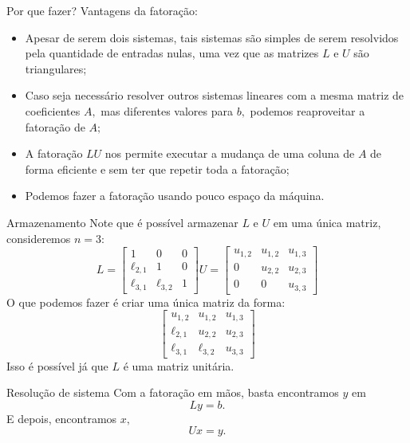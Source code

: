 \documentclass[]{beamer}
\begin{document}
\begin{frame}{Por que fazer?}
Vantagens da fatoração:
\begin{itemize}
\item Apesar de serem dois sistemas, tais sistemas são simples de serem resolvidos pela quantidade de entradas nulas, uma vez que as matrizes $L$ e $U$ são triangulares;

\item  Caso seja necessário resolver outros sistemas lineares com a mesma matriz de coeficientes $A,$ mas diferentes valores para $b,$ podemos reaproveitar a fatoração de $A;$

\item A fatoração $LU$ nos permite executar a mudança de uma coluna de $A$ de forma eficiente e sem ter que repetir toda a fatoração;

\item Podemos fazer a fatoração usando pouco espaço da máquina.
\end{itemize}

\end{frame}

\begin{frame}{Armazenamento}
Note que é possível armazenar $L$ e $U$ em uma única matriz, consideremos $n =3:$
$$L=\begin{bmatrix}1&0&0\\ \ell_{2,1}&1&0\\ \ell_{3,1}&\ell_{3,2}&1\end{bmatrix} U = \begin{bmatrix}u_{1,2}&u_{1,2}&u_{1,3}\\ 0&u_{2,2}&u_{2,3}\\ 0&0&u_{3,3}\end{bmatrix}$$ 
O que podemos fazer é criar uma única matriz da forma:
$$\begin{bmatrix}u_{1,2}&u_{1,2}&u_{1,3}\\ \ell_{2,1}&u_{2,2}&u_{2,3}\\ \ell_{3,1}&\ell_{3,2}&u_{3,3}\end{bmatrix}$$ 
Isso é possível já que $L$ é uma matriz unitária.
\end{frame}



\begin{frame}{Resolução de sistema}
Com a fatoração em mãos, basta encontramos $y$ em
$$Ly=b. $$
E depois, encontramos $x,$
$$ Ux=y.$$
\end{frame}
\end{document}
